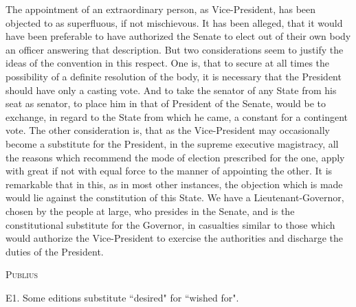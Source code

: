 The appointment of an extraordinary person, as Vice-President, has been objected to as superfluous, if not mischievous. 
It has been alleged, that it would have been preferable to have authorized the Senate to elect out of their own body an officer answering that description. 
But two considerations seem to justify the ideas of the convention in this respect. 
One is, that to secure at all times the possibility of a definite resolution of the body, it is necessary that the President should have only a casting vote. 
And to take the senator of any State from his seat as senator, to place him in that of President of the Senate, would be to exchange, in regard to the State from which he came, a constant for a contingent vote. 
The other consideration is, that as the Vice-President may occasionally become a substitute for the President, in the supreme executive magistracy, all the reasons which recommend the mode of election prescribed for the one, apply with great if not with equal force to the manner of appointing the other. 
It is remarkable that in this, as in most other instances, the objection which is made would lie against the constitution of this State. 
We have a Lieutenant-Governor, chosen by the people at large, who presides in the Senate, and is the constitutional substitute for the Governor, in casualties similar to those which would authorize the Vice-President to exercise the authorities and discharge the duties of the President.

\vspace{.5cm}
\textsc{Publius}

\vspace{1.5cm}

E1. 
Some editions substitute ``desired" for ``wished for".

